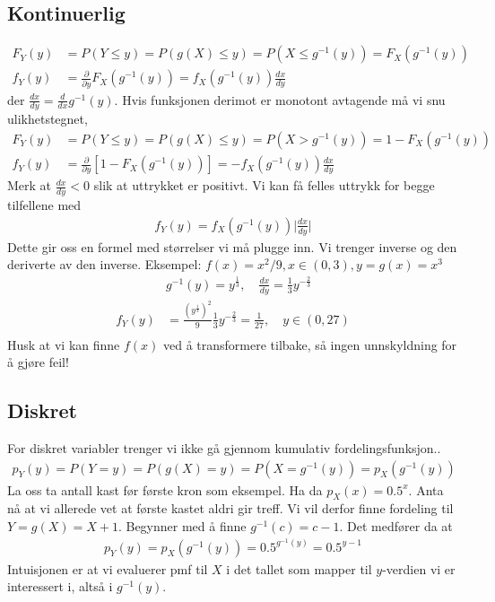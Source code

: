 \subsection{Kontinuerlig}
\begin{align}
F_Y(y) &= P(Y \leq y) = P(g(X) \leq y) = P(X \leq g^{-1}(y)) = F_X(g^{-1}(y)) \\
f_Y(y) &= \frac{\partial}{\partial y} F_X(g^{-1}(y)) = f_X(g^{-1}(y)) \frac{dx}{dy}
\end{align}
der $\frac{dx}{dy} = \frac{d}{dx} g^{-1}(y)$. Hvis funksjonen derimot er monotont avtagende må vi snu ulikhetstegnet,
\begin{align}
F_Y(y) &= P(Y \leq y) = P(g(X) \leq y) = P(X > g^{-1}(y)) = 1-F_X(g^{-1}(y)) \\
f_Y(y) &= \frac{\partial}{\partial y}[1- F_X(g^{-1}(y))] = -f_X(g^{-1}(y)) \frac{dx}{dy}
\end{align}
Merk at $\frac{dx}{dy}<0$ slik at uttrykket er positivt. Vi kan få felles uttrykk for begge tilfellene med 
\begin{align}
f_Y(y) = f_X(g^{-1}(y)) \lvert \frac{dx}{dy}\rvert
\end{align}
Dette gir oss en formel med størrelser vi må plugge inn. Vi trenger inverse og den deriverte av den inverse. Eksempel: $f(x)=x^2/9, x\in(0,3), y=g(x)=x^3$
\begin{align}
&g^{-1}(y) = y^{\frac{1}{3}}, \quad \frac{dx}{dy}  = \frac{1}{3}y^{-\frac{2}{3}} \\
f_Y(y) &= \frac{\left(y^{\frac{1}{3}}\right)^2}{9} \frac{1}{3}y^{-\frac{2}{3}}=\frac{1}{27}, \quad y\in(0,27) \\
\end{align}
Husk at vi kan finne $f(x)$ ved å transformere tilbake, så ingen unnskyldning for å gjøre feil!
\subsection{Diskret}
For diskret variabler trenger vi ikke gå gjennom kumulativ fordelingsfunksjon..
\begin{align}
p_Y(y) = P(Y=y) = P(g(X)=y) = P(X = g^{-1}(y)) = p_X(g^{-1}(y))
\end{align}
La oss ta antall kast før første kron som eksempel. Ha da $p_X(x) = 0.5^x$. Anta nå at vi allerede vet at første kastet aldri gir treff. Vi vil derfor finne fordeling til $Y = g(X) = X+1$. Begynner med å finne $g^{-1}(c) = c-1$. Det medfører da at
\begin{align}
p_Y(y) = p_X(g^{-1}(y)) = 0.5^{g^{-1}(y)} = 0.5^{y-1}
\end{align}
Intuisjonen er at vi evaluerer pmf til $X$ i det tallet som mapper til $y$-verdien vi er interessert i, altså i $g^{-1}(y)$.
